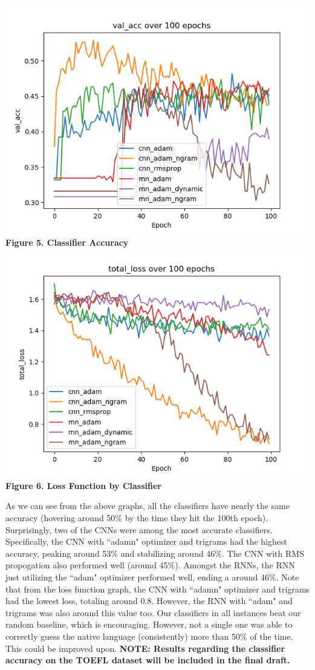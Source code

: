 \documentclass[12pt]{article}
\newcommand\tab[1][1cm]{\hspace*{#1}}
\begin{document}
\begin{center}
	\includegraphics[scale=0.8]{val_acc}\\
	\textbf{Figure 5. Classifier Accuracy}
	\includegraphics[scale=0.8]{total_loss}
	\textbf{Figure 6. Loss Function by Classifier}
\end{center}
\tab As we can see from the above graphs, all the classifiers have nearly the same accuracy (hovering around 50\% by the time they hit the 100th epoch). Surprisingly, two of the CNNs were among the most accurate classifiers. Specifically, the CNN with ``adamn" optimizer and trigrams had the highest accuracy, peaking around 53\% and stabilizing around 46\%. The CNN with RMS propogation also performed well (around 45\%). Amongst the RNNs, the RNN just utilizing the ``adam" optimizer performed well, ending a around 46\%. Note that from the loss function graph, the CNN with ``adamn" optimizer and trigrams had the lowest loss, totaling around 0.8. However, the RNN with ``adam" and trigrams was also around this value too. Our classifiers in all instances beat our random baseline, which is encouraging. However, not a single one was able to correctly guess the native language (consistently) more than 50\% of the time. This could be improved upon. \textbf{NOTE: Results regarding the classifier accuracy on the TOEFL dataset will be included in the final draft.}
\end{document}
